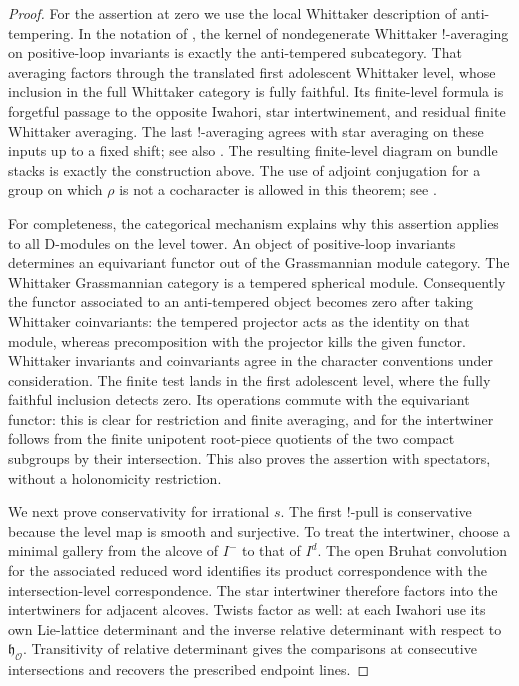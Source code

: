\begin{proof}
For the assertion at zero we use the local Whittaker description of
anti-tempering.  In the notation of
\cite[Lemmas~4.2.0.1 and~4.3.0.1, Equation~(4.3.1)]{FaergemanRaskin},
the kernel of nondegenerate Whittaker $!$-averaging on positive-loop
invariants is exactly the anti-tempered subcategory.  That averaging
factors through the translated first adolescent Whittaker level, whose
inclusion in the full Whittaker category is fully faithful.  Its
finite-level formula is forgetful passage to the opposite Iwahori,
star intertwinement, and residual finite Whittaker averaging.  The last
$!$-averaging agrees with star averaging on these inputs up to a fixed
shift; see also \cite[Section~3.1, Lemma~3.1.4]{BogdanovaWhit}.
The resulting finite-level diagram on bundle stacks is exactly the
construction above.  The use of adjoint conjugation for a group on which
$\rho$ is not a cocharacter is allowed in this theorem; see
\cite[Remark~4.4.0.1]{FaergemanRaskin}.

For completeness, the categorical mechanism explains why this assertion
applies to all D-modules on the level tower.  An object of positive-loop
invariants determines an equivariant functor out of the Grassmannian
module category.  The Whittaker Grassmannian category is a tempered
spherical module.  Consequently the functor associated to an
anti-tempered object becomes zero after taking Whittaker coinvariants:
the tempered projector acts as the identity on that module, whereas
precomposition with the projector kills the given functor.  Whittaker
invariants and coinvariants agree in the character conventions under
consideration.  The finite test lands in the first adolescent level,
where the fully faithful inclusion detects zero.  Its operations commute
with the equivariant functor: this is clear for restriction and finite
averaging, and for the intertwiner follows from the finite unipotent
root-piece quotients of the two compact subgroups by their intersection.
This also proves the assertion with spectators, without a holonomicity
restriction.

We next prove conservativity for irrational $s$.  The first $!$-pull is
conservative because the level map is smooth and surjective.  To treat
the intertwiner, choose a minimal gallery from the alcove of $I^-$ to
that of $I^d$.  The open Bruhat convolution for the associated reduced
word identifies its product correspondence with the intersection-level
correspondence.  The star intertwiner therefore factors into the
intertwiners for adjacent alcoves.  Twists factor as well: at each
Iwahori use its own Lie-lattice determinant and the inverse relative
determinant with respect to $\mathfrak h_{\mathcal O}$.  Transitivity of
relative determinant gives the comparisons at consecutive intersections
and recovers the prescribed endpoint lines.


\end{proof}
